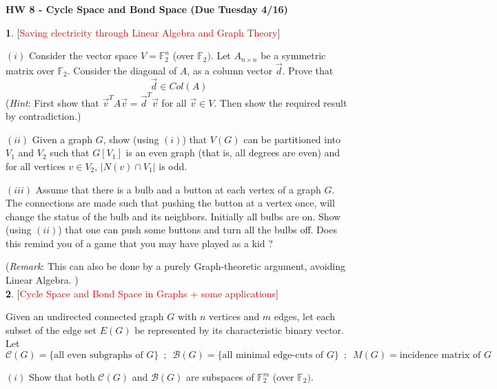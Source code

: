\documentclass[10pt]{article}
\begin{document}
\begin{center}
\textbf{\Large{HW 8 - Cycle Space and Bond Space (Due Tuesday 4/16)}}
\end{center}
\medskip

\textbf{1}. [\textcolor{red}{Saving electricity through Linear Algebra and Graph Theory}]\medskip


$(i)$ Consider the vector space $V=\mathbb{F}_2^n$ (over $\mathbb{F}_2)$. Let $A_{n\times n}$ be a symmetric matrix over $\mathbb{F}_2$. Consider the diagonal of $A$, as a column vector $\overrightarrow{d}$. Prove that $$\overrightarrow{d}\in Col(A)$$ (\emph{Hint}: First show that $\overrightarrow{v}^{T}A\overrightarrow{v}=\overrightarrow{d}^{T}\overrightarrow{v}$ for all $\overrightarrow{v}\in V$. Then show the required result by contradiction.)\medskip

$(ii)$ Given a graph $G$, show (using $(i)$) that $V(G)$ can be partitioned into $V_1$ and $V_2$ such that $G[V_1]$ is an even graph (that is, all degrees are even) and for all vertices $v\in V_2$, $|N(v)\cap V_1|$ is odd.\medskip

$(iii)$ Assume that there is a bulb and a button at each vertex of a graph $G$. The connections are made such that pushing the button at a vertex once, will change the status of the bulb and its neighbors. Initially all bulbs are on. Show (using $(ii)$) that one can push some buttons and turn all the bulbs off. Does this remind you of a game that you may have played as a kid ?\medskip

(\emph{Remark}: This can also be done by a purely Graph-theoretic argument, avoiding Linear Algebra. )\\

\textbf{2}. [\textcolor{red}{Cycle Space and Bond Space in Graphs + some applications}]\medskip

Given an undirected connected graph $G$ with $n$ vertices and $m$ edges, let each subset of the edge set $E(G)$ be represented by its characteristic binary vector. Let $$\mathcal{C}(G)=\{\text{all even subgraphs of}\,\, G \} \,\,\,;\,\,\,\mathcal{B}(G)=\{\text{all minimal edge-cuts of}\,\, G\}\,\,\,;\,\,\,M(G)= \text{incidence matrix of}\,\, G$$

$(i)$ Show that both $\mathcal{C}(G)$ and $\mathcal{B}(G)$ are subspaces of $\mathbb{F}_2^m$ (over $\mathbb{F}_2)$.\medskip
\end{document}
